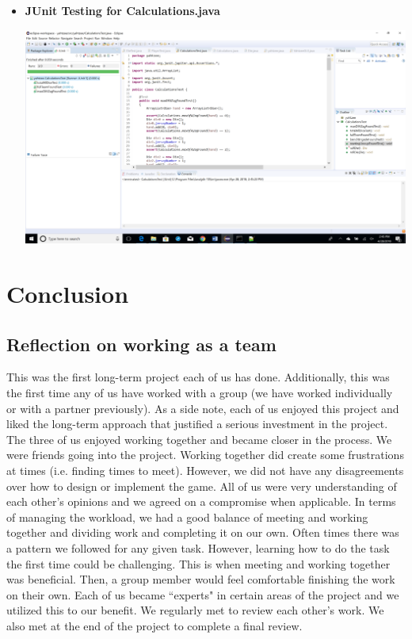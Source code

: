 \documentclass[]{report}   %
\begin{document}
\begin{itemize}
\vspace{.2in}

\item \textbf{JUnit Testing for Calculations.java}
\begin{center}
\includegraphics[width=6in]{Graphics/JUnitTestCalculationsTestScreenshot.png}
\end{center}

\end{itemize}




\chapter{Conclusion}           %
\section{Reflection on working as a team}     %
This was the first long-term project each of us has done. Additionally, this was the first time any of us have worked with a group (we have worked individually or with a partner previously). As a side note, each of us enjoyed this project and liked the long-term approach that justified a serious investment in the project. The three of us enjoyed working together and became closer in the process. We were friends going into the project. Working together did create some frustrations at times (i.e. finding times to meet). However, we did not have any disagreements over how to design or implement the game. All of us were very understanding of each other's opinions and we agreed on a compromise when applicable. In terms of managing the workload, we had a good balance of meeting and working together and dividing work and completing it on our own. Often times there was a pattern we followed for any given task. However, learning how to do the task the first time could be challenging. This is when meeting and working together was beneficial. Then, a group member would feel comfortable finishing the work on their own. Each of us became ``experts" in certain areas of the project and we utilized this to our benefit. We regularly met to review each other's work. We also met at the end of the project to complete a final review.
\end{document}
